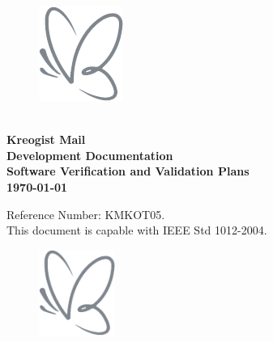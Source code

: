 \documentclass[11pt,a4paper]{article}
\newcommand{\titlesize}{\fontsize{70pt}{\baselineskip}\selectfont}
\begin{document}
    \newcommand{\tabincell}[2]{\begin{tabular}{@{}#1@{}}#2\end{tabular}}
    \begin{titlepage}
        \begin{figure}[h!]
            \hfill\includegraphics{Kreogist.png}
        \end{figure}
        \begin{spacing}{2.0}
            \textcolor[rgb]{0.49,0.52,0.55}{\titlesize \\ \textbf{Kreogist Mail\\ Development Documentation\\}}
            \textcolor[rgb]{0.49,0.52,0.55}{\textbf{Software Verification and Validation Plans}\\}
            \textcolor[rgb]{0.49,0.52,0.55}{\textbf{\today}\\}
        \end{spacing}
        \vfill
        \textcolor[rgb]{0.49,0.52,0.55}{
            \begin{flushright}
                Reference Number: KMKOT05.\\
                This document is capable with IEEE Std 1012-2004.
            \end{flushright}
        }
        \restoregeometry
    \end{titlepage}
    \thispagestyle{empty}
    \begin{figure}[h!]
        \includegraphics[width=2.5cm]{Kreogist.png}
    \end{figure}
    \vspace{4.5cm}
\end{document}

